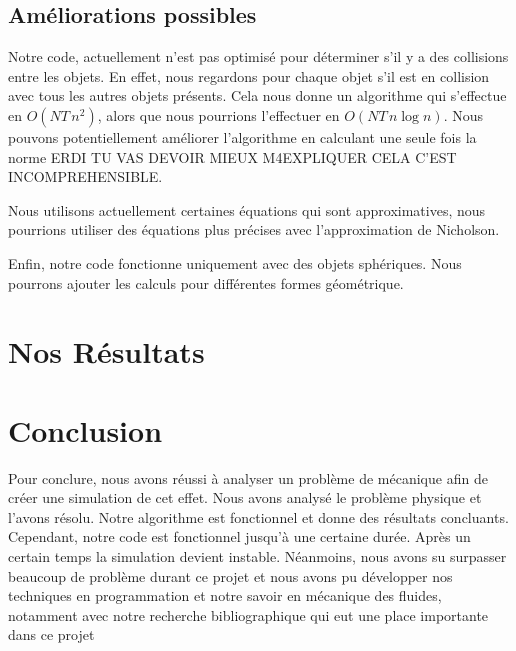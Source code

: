     \subsection{Améliorations possibles}
        Notre code, actuellement n'est pas optimisé pour déterminer s'il y a des collisions entre les objets. En effet, nous regardons pour chaque objet s'il est en collision avec tous les autres objets présents. Cela nous donne un algorithme qui s'effectue en $O(NT\,n^2)$, alors que nous pourrions l'effectuer en $O(NT\, n\log n)$. Nous pouvons potentiellement améliorer l'algorithme en calculant une seule fois la norme ERDI TU VAS DEVOIR MIEUX M4EXPLIQUER CELA C'EST INCOMPREHENSIBLE.

        Nous utilisons actuellement certaines équations qui sont approximatives, nous pourrions utiliser des équations plus précises avec l'approximation de Nicholson.

        Enfin, notre code fonctionne uniquement avec des objets sphériques. Nous pourrons ajouter les calculs pour différentes formes géométrique. 
\section{Nos Résultats}
\section*{Conclusion}
    Pour conclure, nous avons réussi à analyser un problème de mécanique afin de créer une simulation de cet effet. Nous avons analysé le problème physique et l'avons résolu. Notre algorithme est fonctionnel et donne des résultats concluants. Cependant, notre code est fonctionnel jusqu'à une certaine durée. Après un certain temps la simulation devient instable. Néanmoins, nous avons su surpasser beaucoup de problème durant ce projet et nous avons pu développer nos techniques en programmation et notre savoir en mécanique des fluides, notamment avec notre recherche bibliographique qui eut une place importante dans ce projet 
